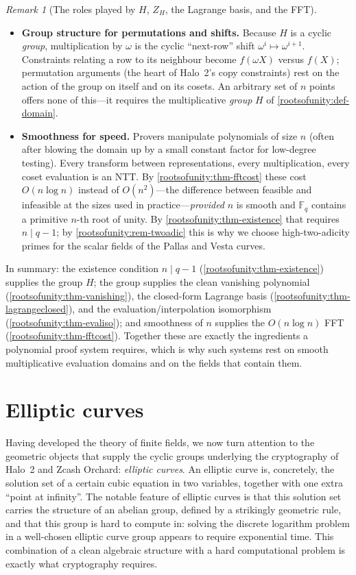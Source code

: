 \documentclass[11pt,a4paper]{article}
\theoremstyle{definition}
\theoremstyle{remark}
\newtheorem{remark}[theorem]{Remark}
\newcommand{\Fq}{\ensuremath{\mathbb{F}_{q}}}
\begin{document}
\begin{remark}[The roles played by \(H\), \(Z_H\), the Lagrange basis, and the FFT]
\begin{itemize}
\item \textbf{Group structure for permutations and shifts.} Because \(H\) is a cyclic \emph{group}, multiplication by \(\omega\) is the cyclic ``next-row'' shift \(\omega^i \mapsto \omega^{i+1}\). Constraints relating a row to its neighbour become \(f(\omega X)\) versus \(f(X)\); permutation arguments (the heart of Halo~2's copy constraints) rest on the action of the group on itself and on its cosets. An arbitrary set of \(n\) points offers none of this---it requires the multiplicative \emph{group} \(H\) of \cref{rootsofunity:def-domain}.

\item \textbf{Smoothness for speed.} Provers manipulate polynomials of size \(n\) (often after blowing the domain up by a small constant factor for low-degree testing). Every transform between representations, every multiplication, every coset evaluation is an NTT. By \cref{rootsofunity:thm-fftcost} these cost \(O(n\log n)\) instead of \(O(n^2)\)---the difference between feasible and infeasible at the sizes used in practice---\emph{provided} \(n\) is smooth and \(\Fq\) contains a primitive \(n\)-th root of unity. By \cref{rootsofunity:thm-existence} that requires \(n \mid q-1\); by \cref{rootsofunity:rem-twoadic} this is why we choose high-two-adicity primes for the scalar fields of the Pallas and Vesta curves.
\end{itemize}
In summary: the existence condition \(n \mid q-1\) (\cref{rootsofunity:thm-existence}) supplies the group \(H\); the group supplies the clean vanishing polynomial (\cref{rootsofunity:thm-vanishing}), the closed-form Lagrange basis (\cref{rootsofunity:thm-lagrangeclosed}), and the evaluation/interpolation isomorphism (\cref{rootsofunity:thm-evaliso}); and smoothness of \(n\) supplies the \(O(n\log n)\) FFT (\cref{rootsofunity:thm-fftcost}). Together these are exactly the ingredients a polynomial proof system requires, which is why such systems rest on smooth multiplicative evaluation domains and on the fields that contain them.
\end{remark}

\clearpage

\section{Elliptic curves}\label{sec:ellipticcurves}

Having developed the theory of finite fields, we now turn attention to the geometric objects that supply the cyclic groups underlying the cryptography of Halo~2 and Zcash Orchard: \emph{elliptic curves}. An elliptic curve is, concretely, the solution set of a certain cubic equation in two variables, together with one extra ``point at infinity''. The notable feature of elliptic curves is that this solution set carries the structure of an abelian group, defined by a strikingly geometric rule, and that this group is hard to compute in: solving the discrete logarithm problem in a well-chosen elliptic curve group appears to require exponential time. This combination of a clean algebraic structure with a hard computational problem is exactly what cryptography requires.
\end{document}

